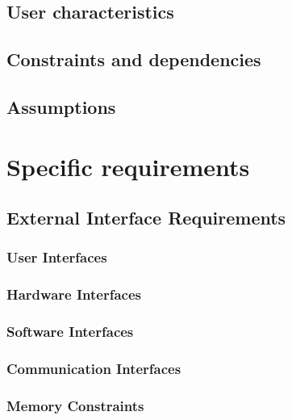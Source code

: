 \documentclass[a4paper,oneside,11pt]{article}
\begin{document}
        \subsection{User characteristics}
            
        \subsection{Constraints and dependencies}
            
        \subsection{Assumptions}
            
        
    \newpage
    \section{Specific requirements}
         
        \subsection{External Interface Requirements}
          \subsubsection{User Interfaces}
                
            \subsubsection{Hardware Interfaces}
                
            \subsubsection{Software Interfaces}
                
            \subsubsection{Communication Interfaces}
                
            \subsubsection{Memory Constraints}
                
            
\end{document}
